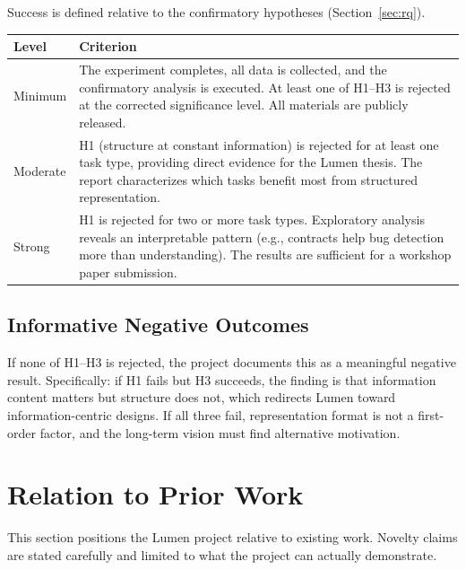 \documentclass[11pt]{article}
\begin{document}
Success is defined relative to the confirmatory hypotheses
(Section~\ref{sec:rq}).

\begin{longtable}{@{}lp{9cm}@{}}
  \toprule
  \textbf{Level} & \textbf{Criterion} \\
  \midrule
  \endfirsthead
  Minimum &
    The experiment completes, all data is collected, and the
    confirmatory analysis is executed.  At least one of H1--H3 is
    rejected at the corrected significance level.  All materials
    are publicly released. \\
  \addlinespace
  Moderate &
    H1 (structure at constant information) is rejected for at least
    one task type, providing direct evidence for the Lumen thesis.
    The report characterizes which tasks benefit most from structured
    representation. \\
  \addlinespace
  Strong &
    H1 is rejected for two or more task types.  Exploratory analysis
    reveals an interpretable pattern (e.g., contracts help bug
    detection more than understanding).  The results are sufficient
    for a workshop paper submission. \\
  \bottomrule
\end{longtable}

\subsection*{Informative Negative Outcomes}

If none of H1--H3 is rejected, the project documents this as a
meaningful negative result.  Specifically: if H1 fails but H3 succeeds,
the finding is that information content matters but structure does not,
which redirects Lumen toward information-centric designs.  If all three
fail, representation format is not a first-order factor, and the
long-term vision must find alternative motivation.


\section{Relation to Prior Work}
\label{sec:prior-work}

This section positions the Lumen project relative to existing work.
Novelty claims are stated carefully and limited to what the project
can actually demonstrate.
\end{document}
